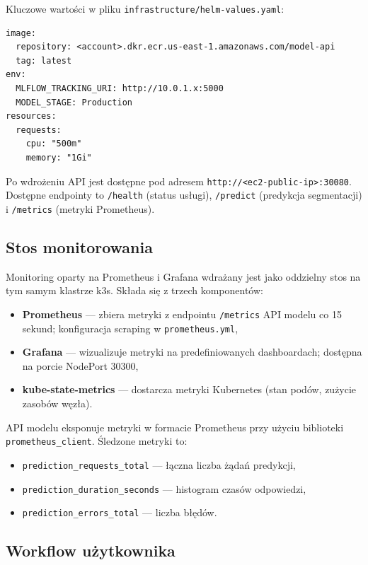 Kluczowe wartości w pliku \texttt{infrastructure/helm-values.yaml}:
\begin{verbatim}
image:
  repository: <account>.dkr.ecr.us-east-1.amazonaws.com/model-api
  tag: latest
env:
  MLFLOW_TRACKING_URI: http://10.0.1.x:5000
  MODEL_STAGE: Production
resources:
  requests:
    cpu: "500m"
    memory: "1Gi"
\end{verbatim}

Po wdrożeniu API jest dostępne pod adresem \texttt{http://<ec2-public-ip>:30080}. Dostępne endpointy to \texttt{/health} (status usługi), \texttt{/predict} (predykcja segmentacji) i \texttt{/metrics} (metryki Prometheus).

\subsection{Stos monitorowania}

Monitoring oparty na Prometheus \cite{prometheus_docs} i Grafana wdrażany jest jako oddzielny stos na tym samym klastrze k3s. Składa się z trzech komponentów:

\begin{itemize}
  \item \textbf{Prometheus} --- zbiera metryki z endpointu \texttt{/metrics} API modelu co 15 sekund; konfiguracja scraping w \texttt{prometheus.yml},
  \item \textbf{Grafana} --- wizualizuje metryki na predefiniowanych dashboardach; dostępna na porcie NodePort 30300,
  \item \textbf{kube-state-metrics} --- dostarcza metryki Kubernetes (stan podów, zużycie zasobów węzła).
\end{itemize}

API modelu eksponuje metryki w formacie Prometheus przy użyciu biblioteki \texttt{prometheus\_client}. Śledzone metryki to:
\begin{itemize}
  \item \texttt{prediction\_requests\_total} --- łączna liczba żądań predykcji,
  \item \texttt{prediction\_duration\_seconds} --- histogram czasów odpowiedzi,
  \item \texttt{prediction\_errors\_total} --- liczba błędów.
\end{itemize}


\subsection{Workflow użytkownika}

